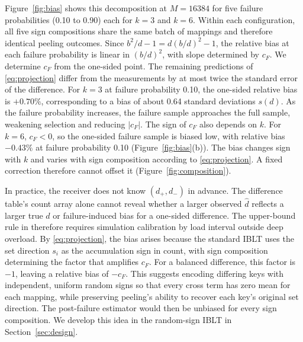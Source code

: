 Figure~\ref{fig:bias} shows this decomposition at $M=16384$ for five failure probabilities (0.10 to 0.90) each for $k=3$ and $k=6$. Within each configuration, all five sign compositions share the same batch of mappings and therefore identical peeling outcomes. Since $b^2/d-1=d(b/d)^2-1$, the relative bias at each failure probability is linear in $(b/d)^2$, with slope determined by $c_F$. We determine $c_F$ from the one-sided point. The remaining predictions of \eqref{eq:projection} differ from the measurements by at most twice the standard error of the difference. For $k=3$ at failure probability 0.10, the one-sided relative bias is $+0.70\%$, corresponding to a bias of about 0.64 standard deviations $s(d)$. As the failure probability increases, the failure sample approaches the full sample, weakening selection and reducing $|c_F|$. The sign of $c_F$ also depends on $k$. For $k=6$, $c_F<0$, so the one-sided failure sample is biased low, with relative bias $-0.43\%$ at failure probability 0.10 (Figure~\ref{fig:bias}(b)). The bias changes sign with $k$ and varies with sign composition according to \eqref{eq:projection}. A fixed correction therefore cannot offset it (Figure~\ref{fig:composition}).

In practice, the receiver does not know $(d_+,d_-)$ in advance. The difference table's count array alone cannot reveal whether a larger observed $\widehat d$ reflects a larger true $d$ or failure-induced bias for a one-sided difference. The upper-bound rule in \cite{wu2026selfsizing} therefore requires simulation calibration by load interval outside deep overload. By \eqref{eq:projection}, the bias arises because the standard IBLT uses the set direction $s_i$ as the accumulation sign in count, with sign composition determining the factor that amplifies $c_F$. For a balanced difference, this factor is $-1$, leaving a relative bias of $-c_F$. This suggests encoding differing keys with independent, uniform random signs so that every cross term has zero mean for each mapping, while preserving peeling's ability to recover each key's original set direction. The post-failure estimator would then be unbiased for every sign composition. We develop this idea in the random-sign IBLT in Section~\ref{sec:design}.
